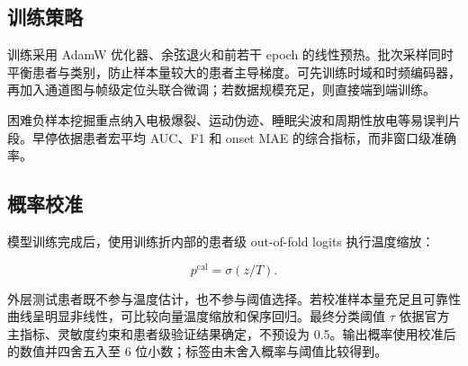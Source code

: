 \documentclass{cumcmthesis_v2}
\numberwithin{figure}{section} %
\numberwithin{table}{section} %
\begin{document}
\subsection{训练策略} 

训练采用 AdamW 优化器、余弦退火和前若干 epoch 的线性预热。批次采样同时平衡患者与类别，防止样本量较大的患者主导梯度。可先训练时域和时频编码器，再加入通道图与帧级定位头联合微调；若数据规模充足，则直接端到端训练。

困难负样本挖掘重点纳入电极爆裂、运动伪迹、睡眠尖波和周期性放电等易误判片段。早停依据患者宏平均 AUC、F1 和 onset MAE 的综合指标，而非窗口级准确率。

\subsection{概率校准}

模型训练完成后，使用训练折内部的患者级 out-of-fold logits 执行温度缩放：

$$
p^{\mathrm{cal}}=\sigma(z/T).
$$

外层测试患者既不参与温度估计，也不参与阈值选择。若校准样本量充足且可靠性曲线呈明显非线性，可比较向量温度缩放和保序回归。最终分类阈值 $\tau$ 依据官方主指标、灵敏度约束和患者级验证结果确定，不预设为 0.5。输出概率使用校准后的数值并四舍五入至 6 位小数；标签由未舍入概率与阈值比较得到。



\end{document}
